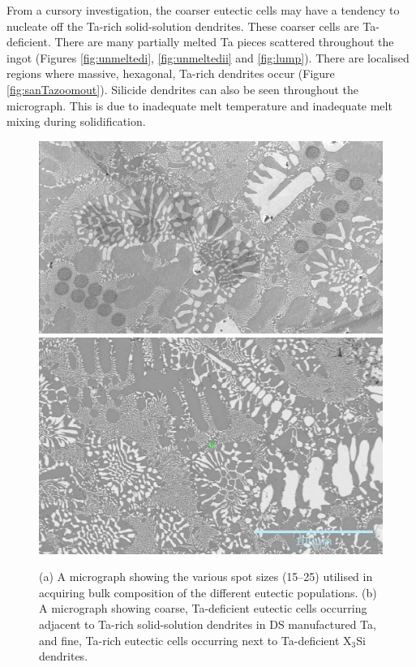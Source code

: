 From a cursory investigation, the coarser eutectic cells may have a tendency to nucleate off the Ta-rich solid-solution dendrites.  These coarser cells are Ta-deficient.  There are many partially melted Ta pieces scattered throughout the ingot (Figures \ref{fig:unmeltedi}, \ref{fig:unmeltedii} and \ref{fig:lump}).  There are localised regions where massive, hexagonal, Ta-rich dendrites occur (Figure \ref{fig:sanTazoomout}).  Silicide dendrites can also be seen throughout the micrograph.  This is due to inadequate melt temperature and inadequate melt mixing during solidification.

%
\begin{figure}[htbp]
\begin{center}
\includegraphics[width=16cm]{CrVTa_mar9_panorama}
\vspace{\fill}
\includegraphics[width=16cm]{santa}
\caption{(a) A micrograph showing the various spot sizes (15--25\micro\metre) utilised in acquiring bulk composition of the different eutectic populations.  (b) A micrograph showing coarse, Ta-deficient eutectic cells occurring adjacent to Ta-rich solid-solution dendrites in DS manufactured Ta, and fine, Ta-rich eutectic cells occurring next to Ta-deficient X$_3$Si dendrites.}
\label{fig:CrVTa_panorama}
\end{center}
\end{figure}
